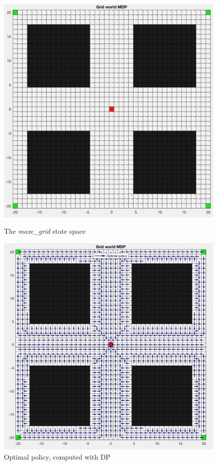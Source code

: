 \documentclass[a4paper]{report}
\begin{document}
{{			\begin{figure}[h!]
				\begin{minipage}{0.45\linewidth}
					\includegraphics[width=\linewidth]{maze_grid}
					\caption{The \emph{maze\_grid} state space}
					\label{fig::maze_display}
				\end{minipage}
				\hfill
				\begin{minipage}{0.45\linewidth}
					\includegraphics[width=\linewidth]{maze_optimal_policy}
					\caption{Optimal policy, computed with DP}
					\label{fig::maze_optimal_policy}
				\end{minipage}
			\end{figure}
				
}}
\end{document}
